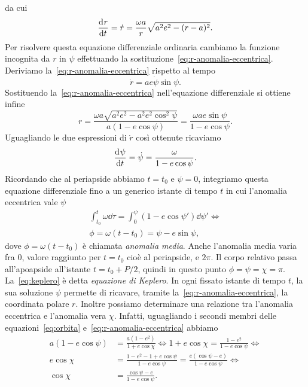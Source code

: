 da cui
\begin{equation}
  \frac{{\mathop{}\!\mathrm{d}^{}}r}{\mathop{}\!\mathrm{d} {t}^{}} = \dot{r} = \frac{\omega a}{r}\sqrt{a^2e^2 - (r-a)^2}.
\end{equation}
Per risolvere questa equazione differenziale ordinaria cambiamo la funzione
incognita da $r$ in $\psi$ effettuando la
sostituzione~\eqref{eq:r-anomalia-eccentrica}. Deriviamo
la~\eqref{eq:r-anomalia-eccentrica} rispetto al tempo
\begin{equation}
  \dot{r} = ae\dot{\psi}\sin\psi.
\end{equation}
Sostituendo la~\eqref{eq:r-anomalia-eccentrica} nell'equazione differenziale si
ottiene infine
\begin{equation}
  r = \frac{\omega a\sqrt{a^2e^2 - a^2e^2\cos^2\psi}}{a(1-e\cos\psi)} =
  \frac{\omega ae\sin\psi}{1-e\cos\psi}.
\end{equation}
Uguagliando le due espressioni di $\dot{r}$ così ottenute ricaviamo
\begin{equation}
  \frac{{\mathop{}\!\mathrm{d}^{}}\psi}{\mathop{}\!\mathrm{d} {t}^{}} = \dot{\psi} = \frac{\omega}{1-e\cos\psi}.
\end{equation}
Ricordando che al periapside abbiamo $t = t_0$ e $\psi = 0$, integriamo questa
equazione differenziale fino a un generico istante di tempo $t$ in cui
l'anomalia eccentrica vale $\psi$
\begin{gather}
  \int_{t_0}^t \omega\dd \tau = \int_0^\psi(1-e\cos\psi')\dd \psi' \iff\\
  \phi = \omega(t - t_0) = \psi - e\sin\psi, \label{eq:keplero}
\end{gather}
dove $\phi = \omega(t-t_0)$ è chiamata \emph{anomalia media}. Anche l'anomalia
media varia fra $0$, valore raggiunto per $t = t_0$ cioè al periapside, e
$2\pi$. Il corpo relativo passa all'apoapside all'istante $t = t_0 + P/2$,
quindi in questo punto $\phi = \psi = \chi = \pi$. La~\eqref{eq:keplero} è detta
\emph{equazione di Keplero}. In ogni fissato istante di tempo $t$, la sua
soluzione $\psi$ permette di ricavare, tramite
la~\eqref{eq:r-anomalia-eccentrica}, la coordinata polare $r$. Inoltre possiamo
determinare una relazione tra l'anomalia eccentrica e l'anomalia vera $\chi$.
Infatti, uguagliando i secondi membri delle equazioni~\eqref{eq:orbita}
e~\eqref{eq:r-anomalia-eccentrica} abbiamo
\begin{equation}
  \begin{aligned}
    a(1-e\cos\psi) &= \frac{a(1-e^2)}{1+e\cos\chi} \iff 1+e\cos\chi =
    \frac{1-e^2}{1-e\cos\psi} \iff \\
    e\cos\chi &= \frac{1-e^2-1+e\cos\psi}{1-e\cos\psi} =
    \frac{e(\cos\psi-e)}{1-e\cos\psi} \iff \\
    \cos\chi &= \frac{\cos\psi-e}{1-e\cos\psi}.
  \end{aligned}
\end{equation}
